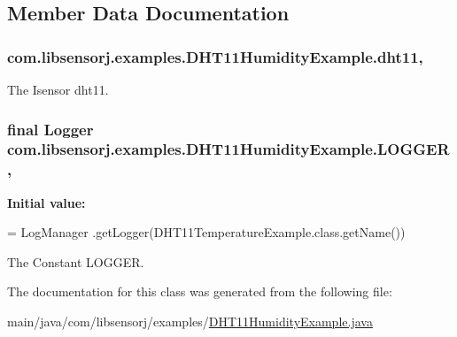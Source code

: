 \subsection{Member Data Documentation}
\hypertarget{classcom_1_1libsensorj_1_1examples_1_1DHT11HumidityExample_a4e50eabfe642f347fcf1b39198da5739}{}
\subsubsection[{dht11}]{ com.\+libsensorj.\+examples.\+D\+H\+T11\+Humidity\+Example.\+dht11\hspace{0.3cm}{\ttfamily [static]}, {\ttfamily [private]}}\label{classcom_1_1libsensorj_1_1examples_1_1DHT11HumidityExample_a4e50eabfe642f347fcf1b39198da5739}
The Isensor dht11. \hypertarget{classcom_1_1libsensorj_1_1examples_1_1DHT11HumidityExample_aee9ba7d87ffaf4d9571628bf3017ed61}{}
\subsubsection[{L\+O\+G\+G\+E\+R}]{\setlength{\rightskip}{0pt plus 5cm}final Logger com.\+libsensorj.\+examples.\+D\+H\+T11\+Humidity\+Example.\+L\+O\+G\+G\+E\+R\hspace{0.3cm}{\ttfamily [static]}, {\ttfamily [private]}}\label{classcom_1_1libsensorj_1_1examples_1_1DHT11HumidityExample_aee9ba7d87ffaf4d9571628bf3017ed61}
{\bfseries Initial value\+:}
\begin{DoxyCode}
= LogManager
            .getLogger(DHT11TemperatureExample.class.getName())
\end{DoxyCode}
The Constant L\+O\+G\+G\+E\+R. 

The documentation for this class was generated from the following file\+:\begin{DoxyCompactItemize}
\item 
main/java/com/libsensorj/examples/\hyperlink{DHT11HumidityExample_8java}{D\+H\+T11\+Humidity\+Example.\+java}\end{DoxyCompactItemize}
